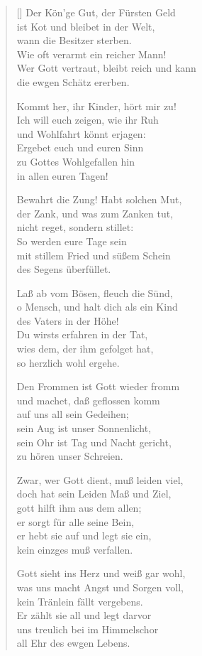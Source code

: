 \begin{multicols}{2}
\begin{verse}[\versewidth]
 Der Kön'ge Gut, der Fürsten Geld\\
ist Kot und bleibet in der Welt,\\
wann die Besitzer sterben.\\
Wie oft verarmt ein reicher Mann!\\
Wer Gott vertraut, bleibt reich und kann\\
die ewgen Schätz ererben.

 Kommt her, ihr Kinder, hört mir zu!\\
Ich will euch zeigen, wie ihr Ruh\\
und Wohlfahrt könnt erjagen:\\
Ergebet euch und euren Sinn\\
zu Gottes Wohlgefallen hin\\
in allen euren Tagen!

 Bewahrt die Zung! Habt solchen Mut,\\
der Zank, und was zum Zanken tut,\\
nicht reget, sondern stillet:\\
So werden eure Tage sein\\
mit stillem Fried und süßem Schein\\
des Segens überfüllet.

 Laß ab vom Bösen, fleuch die Sünd,\\
o Mensch, und halt dich als ein Kind\\
des Vaters in der Höhe!\\
Du wirsts erfahren in der Tat,\\
wies dem, der ihm gefolget hat,\\
so herzlich wohl ergehe.

 Den Frommen ist Gott wieder fromm\\
und machet, daß geflossen komm\\
auf uns all sein Gedeihen;\\
sein Aug ist unser Sonnenlicht,\\
sein Ohr ist Tag und Nacht gericht,\\
zu hören unser Schreien.

 Zwar, wer Gott dient, muß leiden viel,\\
doch hat sein Leiden Maß und Ziel,\\
gott hilft ihm aus dem allen;\\
er sorgt für alle seine Bein,\\
er hebt sie auf und legt sie ein,\\
kein einzges muß verfallen.

 Gott sieht ins Herz und weiß gar wohl,\\
was uns macht Angst und Sorgen voll,\\
kein Tränlein fällt vergebens.\\
Er zählt sie all und legt darvor\\
uns treulich bei im Himmelschor\\
all Ehr des ewgen Lebens.

\end{verse}
\end{multicols}
